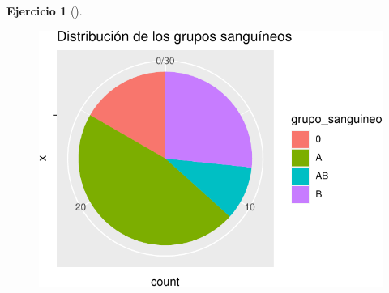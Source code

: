 \documentclass[
  a4paper,
]{scrreport}
\theoremstyle{definition}
\newtheorem{exercise}{Ejercicio}[chapter]
\theoremstyle{remark}
\begin{document}
\begin{exercise}[]
\begin{enumerate}
\begin{tcolorbox}
  \begin{figure}[H]

  {\centering \includegraphics{03-frecuencias-graficos_files/figure-pdf/unnamed-chunk-27-1.pdf}

  }

  \end{figure}

  \end{tcolorbox}
\end{enumerate}

\end{exercise}
\end{document}
